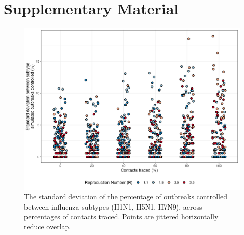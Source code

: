 \documentclass{article}
\begin{document}



\clearpage

\section*{Supplementary Material}

\setcounter{figure}{0}
\renewcommand{\thefigure}{S\arabic{figure}}


\begin{figure}[ht]
\centering
\includegraphics[width=\textwidth]{../plots/prop_outbreak_control_var_reproduction_number.png}
\caption{The standard deviation of the percentage of outbreaks controlled between influenza subtypes (H1N1, H5N1, H7N9), across percentages of contacts traced. Points are jittered horizontally reduce overlap.}
\label{fig:prop-outbreak-control-var-R}
\end{figure}
\end{document}
